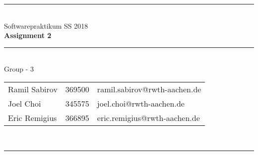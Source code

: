\documentclass[a4paper,12pt]{article}
\begin{document}
\begin{center}
	\rule{\textwidth}{0.1pt}\\[1cm]
	
	\Large Softwarepraktikum SS 2018\\\bf Assignment 2 %
\end{center}


\begin{center}

	\rule{\textwidth}{0.1pt}\\[0.5cm]

	{\Large Group - 3\\[5mm]} %

	\begin{tabular}{lll}
		Ramil Sabirov & 369500 & ramil.sabirov@rwth-aachen.de\\

		Joel Choi & 345575 & joel.choi@rwth-aachen.de \\

		Eric Remigius & 366895 & eric.remigius@rwth-aachen.de \\

	\end{tabular}\\[0.5cm]

	\rule{\textwidth}{0.1pt}\\[1cm]

\end{center}




\end{document}

